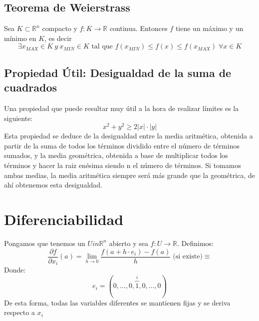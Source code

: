 \documentclass[11pt]{article}
\providecommand{\abs}[1]{\left\lvert #1\right\rvert}
\providecommand{\abs}[1]{\left\lvert #1\right\rvert}
\newcommand{\R}{\mathbb{R}}
\theoremstyle{plain}
\begin{document}
        \subsection{Teorema de Weierstrass} %
        \label{sub:teorema_de_weierstrass}
            Sea $K\subset \R^n$ compacto y $f:K\rightarrow \R$ continua. Entonces $f$ tiene un máximo y un mínimo en $K$, es decir
            \begin{equation}
                 \exists x_{MAX} \in K \ y \ x_{MIN} \in K \text{ tal que } f(x_{MIN})\le f(x) \le f(x_{MAX}) \; \forall x \in K
             \end{equation} 
        
        \subsection{Propiedad Útil: Desigualdad de la suma de cuadrados} %
        \label{sub:propiedad_útil_desigualdad_de_la_suma_de_cuadrados}
            Una propiedad que puede resultar muy útil a la hora de realizar límites es la siguiente:
            \begin{equation}
                x^2 + y^2 \ge 2\abs{x}\cdot\abs{y}
            \end{equation}
            Esta propiedad se deduce de la desigualdad entre la media aritmética, obtenida a partir de la suma de todos los términos dividido entre el número de términos sumados, y la media geométrica, obtenida a base de multiplicar todos los términos y hacer la raiz enésima siendo n el número de términos. Si tomamos ambas medias, la media aritmética siempre será más grande que la geométrica, de ahí obtenemos esta desigualdad.
    \section{Diferenciabilidad} %
    \label{sec:diferenciabilidad}
        Pongamos que tenemos un $U in \R^n$ abierto y sea $f:U \rightarrow \R$. Definimos:
        \begin{equation}
            \frac{\partial f}{\partial x_i} (a) = \lim_{h\to 0} \frac{f(a +h\cdot e_i) - f(a)}{h} \; \text{(si existe)} \equiv 
        \end{equation}
        Donde: \[e_i = (0,...,0,\overbrace{1}^{i},0,...,0)\]
        De esta forma, todas las variables diferentes se mantienen fijas y se deriva respecto a $x_i$
\end{document}
